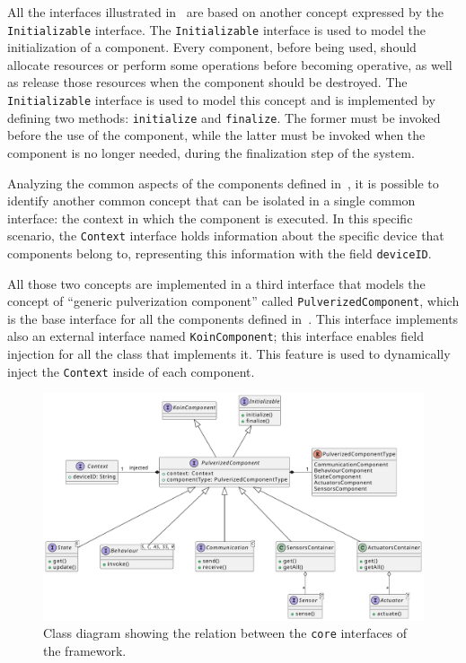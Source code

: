 All the interfaces illustrated in~ are based on another concept expressed by the \texttt{Initializable} interface.
The \texttt{Initializable} interface is used to model the initialization of a component. Every component, before being used, should allocate resources
or perform some operations before becoming operative, as well as release those resources when the component should be destroyed.
The \texttt{Initializable} interface is used to model this concept and is implemented by defining two methods: \texttt{initialize} and
\texttt{finalize}. The former must be invoked before the use of the component, while the latter must be invoked when the component is no longer
needed, during the finalization step of the system.

Analyzing the common aspects of the components defined in~, it is possible to identify another common concept that can
be isolated in a single common interface: the context in which the component is executed. In this specific scenario, the \texttt{Context} interface
holds information about the specific device that components belong to, representing this information with the field \texttt{deviceID}.

All those two concepts are implemented in a third interface that models the concept of ``generic pulverization component'' called
\texttt{PulverizedComponent}, which is the base interface for all the components defined in~.
This interface implements also an external interface named \texttt{KoinComponent}; this interface enables field injection for all the class that
implements it. This feature is used to dynamically inject the \texttt{Context} inside of each component.

\begin{figure}[ht]
	\centering
	\includegraphics[width=\textwidth]{figures/core-impl-interfaces.pdf}
	\caption[Core interface class diagram]{Class diagram showing the relation between the \texttt{core} interfaces of the framework.}
	\label{fig:core-interfaces-class-diagram}
\end{figure}

